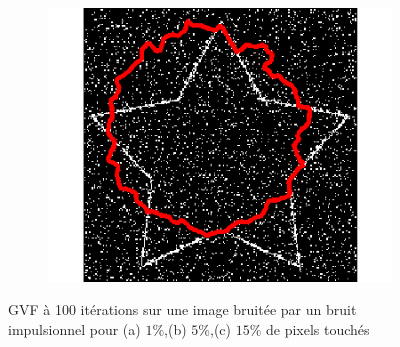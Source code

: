 \begin{appendices}
\begin{figure}[H]
\begin{subfigure}[c]{0.3\linewidth}
\includegraphics[width=\textwidth]{Chapters/Images/Noise/gvfimp15}
\caption{}
\end{subfigure}
\caption{GVF à 100 itérations sur une image bruitée par un bruit impulsionnel pour (a) $1\%$,(b) $5\%$,(c) $15\%$ de pixels touchés}
\end{figure}


\end{appendices}
